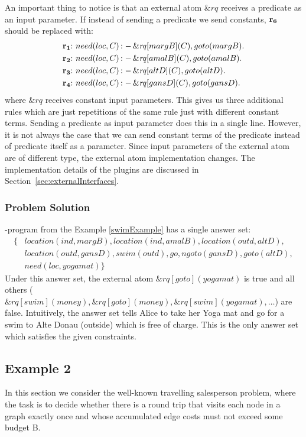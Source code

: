 \documentclass[a4paper, titlepage]{article}
\newcommand{\ext}[3]{\ensuremath{\&{\mathit{#1}}[#2](#3)}}
\DeclareMathOperator{\leftimpl}{:-}
\newcommand{\row}[1]{%
  \ensuremath{\color{black}\ensuremath{\mathbf{#1}} \color{black}}%
}
\newcommand{\rowprefix}[1]{%
  \ensuremath{\color{black}\mathbf{#1{:}}\ }%
}
\begin{document}
An important thing to notice is that an external atom 
$\mathit{\&rq}$ receives a predicate as an input parameter. If instead of sending a predicate we send 
constants, $\row{r_6}$ should be replaced with:
\begin{align*}
\rowprefix{r_1}& need(loc, C) \leftimpl \ext{rq}{margB}{C}, 
goto(margB).\\
\rowprefix{r_2}& need(loc, C) \leftimpl \ext{rq}{amalB}{C}, 
goto(amalB).\\
\rowprefix{r_3}& need(loc, C) \leftimpl \ext{rq}{altD}{C}, 
goto(altD).\\
\rowprefix{r_4}& need(loc, C) \leftimpl \ext{rq}{gansD}{C}, 
goto(gansD).
\end{align*}    
where $\&rq$ receives constant input parameters. This gives us three additional rules which are just 
repetitions of the same rule just with different constant 
terms. Sending a predicate as input parameter does this in a 
single line. However, it is not always the case that we can send constant terms of the predicate instead of predicate itself  as a parameter. Since input parameters of the external atom are of different type, the external atom implementation changes. The implementation details of the plugins are discussed in Section~\ref{sec:externalInterfaces}.

\subsubsection{Problem Solution}
\hex{}-program from the Example \ref{swimExample} has a 
single answer set:
\begin{align*}
\{ & 
location(ind,margB),location(ind,amalB),location(outd,altD), 
\\
& location(outd,gansD), 
swim(outd),go,ngoto(gansD),goto(altD),\\
& need(loc,yogamat) \} 
\end{align*}
Under this answer set, the external atom $\ext{rq}{goto}
{yogamat}$ is true and all others ($\ext{rq}{swim}
{money}, \ext{rq}{goto}{money}, \ext{rq}{swim}{yogamat}, 
\dots $) are false. Intuitively, the answer set tells Alice to 
take her Yoga mat and go for a swim to Alte Donau (outside) 
which is free of charge. This is the only answer set which 
satisfies the given constraints.    

\subsection{Example 2}
\label{traveling}
In this section we consider the well-known travelling 
salesperson problem, where the task is to decide whether there 
is a round trip that visits each node in a graph exactly 
once and whose accumulated edge costs must not exceed some 
budget B.
\end{document}
